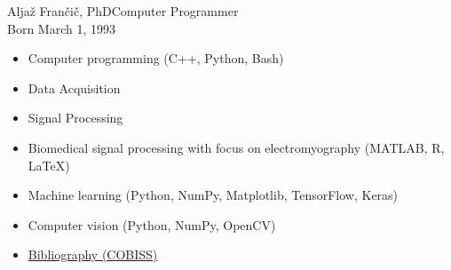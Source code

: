\documentclass{article}
\begin{document}
\begin{cv}[avatar]{Aljaž Frančič, PhD}{Computer Programmer\\\small{Born March 1, 1993}}





\begin{cvevent}[Jan 2024][Present]
    \begin{itemize}
        \item Computer programming (C++, Python, Bash)
        \item Data Acquisition
        \item Signal Processing
    \end{itemize}
\end{cvevent}

\begin{cvevent}[Oct 2018][Sep 2022]
    \begin{itemize}
        \item Biomedical signal processing with focus on electromyography \newline (MATLAB, R, LaTeX)
        \item Machine learning (Python, NumPy, Matplotlib, TensorFlow, Keras)
        \item Computer vision (Python, NumPy, OpenCV)
        \item \href{https://bib.cobiss.net/bibliographies/si/webBiblio/bib201_20231204_183141_52032.html}{Bibliography (COBISS)} 
    \end{itemize}
\end{cvevent}



\end{cv}
\end{document}
